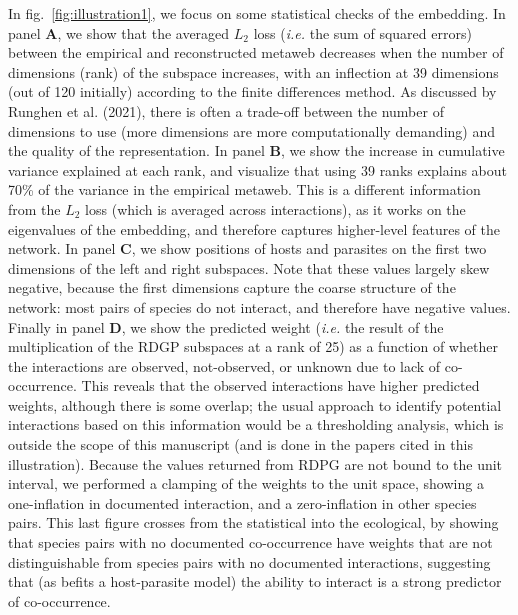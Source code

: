 \documentclass[11pt]{article}
\begin{document}
In fig.~\ref{fig:illustration1}, we focus on some statistical checks of
the embedding. In panel \textbf{A}, we show that the averaged \(L_2\)
loss (\emph{i.e.} the sum of squared errors) between the empirical and
reconstructed metaweb decreases when the number of dimensions (rank) of
the subspace increases, with an inflection at 39 dimensions (out of 120
initially) according to the finite differences method. As discussed by
Runghen et al. (2021), there is often a trade-off between the number of
dimensions to use (more dimensions are more computationally demanding)
and the quality of the representation. In panel \textbf{B}, we show the
increase in cumulative variance explained at each rank, and visualize
that using 39 ranks explains about 70\% of the variance in the empirical
metaweb. This is a different information from the \(L_2\) loss (which is
averaged across interactions), as it works on the eigenvalues of the
embedding, and therefore captures higher-level features of the network.
In panel \textbf{C}, we show positions of hosts and parasites on the
first two dimensions of the left and right subspaces. Note that these
values largely skew negative, because the first dimensions capture the
coarse structure of the network: most pairs of species do not interact,
and therefore have negative values. Finally in panel \textbf{D}, we show
the predicted weight (\emph{i.e.} the result of the multiplication of
the RDGP subspaces at a rank of 25) as a function of whether the
interactions are observed, not-observed, or unknown due to lack of
co-occurrence. This reveals that the observed interactions have higher
predicted weights, although there is some overlap; the usual approach to
identify potential interactions based on this information would be a
thresholding analysis, which is outside the scope of this manuscript
(and is done in the papers cited in this illustration). Because the
values returned from RDPG are not bound to the unit interval, we
performed a clamping of the weights to the unit space, showing a
one-inflation in documented interaction, and a zero-inflation in other
species pairs. This last figure crosses from the statistical into the
ecological, by showing that species pairs with no documented
co-occurrence have weights that are not distinguishable from species
pairs with no documented interactions, suggesting that (as befits a
host-parasite model) the ability to interact is a strong predictor of
co-occurrence.
\end{document}
